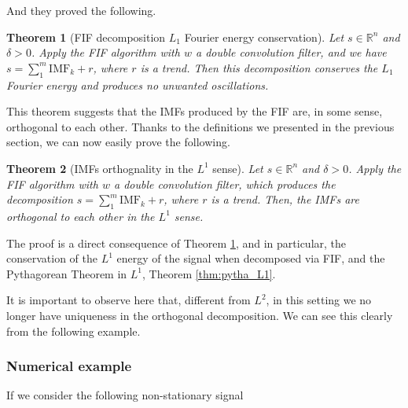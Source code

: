 \documentclass{article}
\newtheorem{theorem}{Theorem}
\begin{document}
And they proved the following.

\begin{theorem}[FIF decomposition $L_1$ Fourier energy conservation]\label{thm:Energy_conservation}
Let $s\in \mathbb{R}^n$ and $\delta >0$. Apply the FIF algorithm with $w$ a double convolution filter, and we have $s=\displaystyle{\sum_1^m \textrm{IMF}_k + r}$, where $r$ is a trend. Then this decomposition conserves the $L_1$ Fourier energy and produces no unwanted oscillations.
\end{theorem}

This theorem suggests that the IMFs produced by the FIF are, in some sense, orthogonal to each other. Thanks to the definitions we presented in the previous section, we can now easily prove the following.

\begin{theorem}[IMFs orthognality in the $L^1$ sense] \label{thm:IMFs_orthogonality}
Let $s\in \mathbb{R}^n$ and $\delta >0$. Apply the FIF algorithm with $w$ a double convolution filter, which produces the decomposition $s=\displaystyle{\sum_1^m \textrm{IMF}_k + r}$, where $r$ is a trend. Then, the IMFs are orthogonal to each other in the $L^1$ sense.
\end{theorem}

The proof is a direct consequence of Theorem \ref{thm:Energy_conservation}, and in particular, the conservation of the $L^1$ energy of the signal when decomposed via FIF, and the Pythagorean Theorem in $L^1$, Theorem \ref{thm:pytha_L1}.

It is important to observe here that, different from $L^2$, in this setting we no longer have uniqueness in the orthogonal decomposition. We can see this clearly from the following example.

\subsubsection{Numerical example}

If we consider the following non-stationary signal
\end{document}
